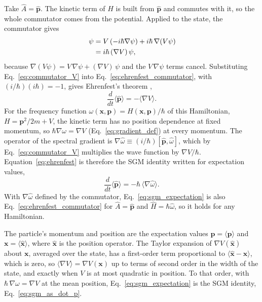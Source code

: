 \documentclass[aps,prd,onecolumn,tightenlines,nofootinbib,notitlepage,11pt,floatfix]{revtex4-2}
\theoremstyle{indentedtheorem}
\begin{document}
Take $\hat{A}=\hat{\mathbf{p}}$. The kinetic term of $\hat{H}$ is built from $\hat{\mathbf{p}}$ and commutes with it, so the whole commutator comes from the potential. Applied to the state, the commutator gives
\begin{align}
    [\hat{H},\hat{\mathbf{p}}] \, \psi &= V \, (-i\hbar\nabla\psi) + i\hbar\,\nabla(V\psi) \notag\\
    &= i\hbar\,(\nabla V) \, \psi ,
    \label{eq:commutator_V}
\end{align}
because $\nabla(V\psi)=V\,\nabla\psi+(\nabla V)\,\psi$ and the $V\,\nabla\psi$ terms cancel. Substituting Eq.~\eqref{eq:commutator_V} into Eq.~\eqref{eq:ehrenfest_commutator}, with $(i/\hbar)(i\hbar)=-1$, gives Ehrenfest's theorem \citep{Ehrenfest1927Bemerkung},
\begin{equation}
    \frac{d}{dt}\langle\hat{\mathbf{p}}\rangle = -\langle\nabla V\rangle .
    \label{eq:ehrenfest}
\end{equation}
For the frequency function $\omega(\mathbf{x},\mathbf{p})=H(\mathbf{x},\mathbf{p})/\hbar$ of this Hamiltonian, $H=\mathbf{p}^2/2m+V$, the kinetic term has no position dependence at fixed momentum, so $\hbar\nabla\omega=\nabla V$ (Eq.~\eqref{eq:gradient_def}) at every momentum. The operator of the spectral gradient is $\nabla\hat{\omega}\equiv(i/\hbar)[\hat{\mathbf{p}},\hat{\omega}]$, which by Eq.~\eqref{eq:commutator_V} multiplies the wave function by $\nabla V/\hbar$. Equation~\eqref{eq:ehrenfest} is therefore the SGM identity written for expectation values,
\begin{equation}
    \frac{d}{dt}\langle\hat{\mathbf{p}}\rangle = -\hbar\,\langle\nabla\hat{\omega}\rangle .
    \label{eq:sgm_expectation}
\end{equation}
With $\nabla\hat{\omega}$ defined by the commutator, Eq.~\eqref{eq:sgm_expectation} is also Eq.~\eqref{eq:ehrenfest_commutator} for $\hat{A}=\hat{\mathbf{p}}$ and $\hat{H}=\hbar\hat{\omega}$, so it holds for any Hamiltonian.

The particle's momentum and position are the expectation values $\mathbf{p}=\langle\hat{\mathbf{p}}\rangle$ and $\mathbf{x}=\langle\hat{\mathbf{x}}\rangle$, where $\hat{\mathbf{x}}$ is the position operator. The Taylor expansion of $\nabla V(\hat{\mathbf{x}})$ about $\mathbf{x}$, averaged over the state, has a first-order term proportional to $\langle\hat{\mathbf{x}}-\mathbf{x}\rangle$, which is zero, so $\langle\nabla V\rangle=\nabla V(\mathbf{x})$ up to terms of second order in the width of the state, and exactly when $V$ is at most quadratic in position. To that order, with $\hbar\,\nabla\omega=\nabla V$ at the mean position, Eq.~\eqref{eq:sgm_expectation} is the SGM identity, Eq.~\eqref{eq:sgm_as_dot_p}.
\end{document}
